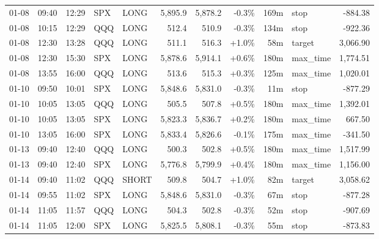 \documentclass[11pt,a4paper,twoside]{article}
\begin{document}
\begin{center}
\begin{longtable}{>{\color{txtmain}}l l l l l r r r r >{\color{txtmain}}l r}
01-08 & 09:40 & 12:29 & SPX & LONG & 5,895.9 & 5,878.2 & \textcolor{lossred}{-0.3\%} & 169m & stop & \textcolor{lossred}{-884.38} \\
01-08 & 10:15 & 12:29 & QQQ & LONG & 512.4 & 510.9 & \textcolor{lossred}{-0.3\%} & 134m & stop & \textcolor{lossred}{-922.36} \\
01-08 & 12:30 & 13:28 & QQQ & LONG & 511.1 & 516.3 & \textcolor{wingreen}{+1.0\%} & 58m & target & \textcolor{wingreen}{3,066.90} \\
01-08 & 12:30 & 15:30 & SPX & LONG & 5,878.6 & 5,914.1 & \textcolor{wingreen}{+0.6\%} & 180m & max\_time & \textcolor{wingreen}{1,774.51} \\
01-08 & 13:55 & 16:00 & QQQ & LONG & 513.6 & 515.3 & \textcolor{wingreen}{+0.3\%} & 125m & max\_time & \textcolor{wingreen}{1,020.01} \\
01-10 & 09:50 & 10:01 & SPX & LONG & 5,848.6 & 5,831.0 & \textcolor{lossred}{-0.3\%} & 11m & stop & \textcolor{lossred}{-877.29} \\
01-10 & 10:05 & 13:05 & QQQ & LONG & 505.5 & 507.8 & \textcolor{wingreen}{+0.5\%} & 180m & max\_time & \textcolor{wingreen}{1,392.01} \\
01-10 & 10:05 & 13:05 & SPX & LONG & 5,823.3 & 5,836.7 & \textcolor{wingreen}{+0.2\%} & 180m & max\_time & \textcolor{wingreen}{667.50} \\
01-10 & 13:05 & 16:00 & SPX & LONG & 5,833.4 & 5,826.6 & \textcolor{lossred}{-0.1\%} & 175m & max\_time & \textcolor{lossred}{-341.50} \\
01-13 & 09:40 & 12:40 & QQQ & LONG & 500.3 & 502.8 & \textcolor{wingreen}{+0.5\%} & 180m & max\_time & \textcolor{wingreen}{1,517.99} \\
01-13 & 09:40 & 12:40 & SPX & LONG & 5,776.8 & 5,799.9 & \textcolor{wingreen}{+0.4\%} & 180m & max\_time & \textcolor{wingreen}{1,156.00} \\
01-14 & 09:40 & 11:02 & QQQ & SHORT & 509.8 & 504.7 & \textcolor{wingreen}{+1.0\%} & 82m & target & \textcolor{wingreen}{3,058.62} \\
01-14 & 09:55 & 11:02 & SPX & LONG & 5,848.6 & 5,831.0 & \textcolor{lossred}{-0.3\%} & 67m & stop & \textcolor{lossred}{-877.28} \\
01-14 & 11:05 & 11:57 & QQQ & LONG & 504.3 & 502.8 & \textcolor{lossred}{-0.3\%} & 52m & stop & \textcolor{lossred}{-907.69} \\
01-14 & 11:05 & 12:00 & SPX & LONG & 5,825.5 & 5,808.1 & \textcolor{lossred}{-0.3\%} & 55m & stop & \textcolor{lossred}{-873.83} \\

\end{longtable}
\end{center}
\end{document}
